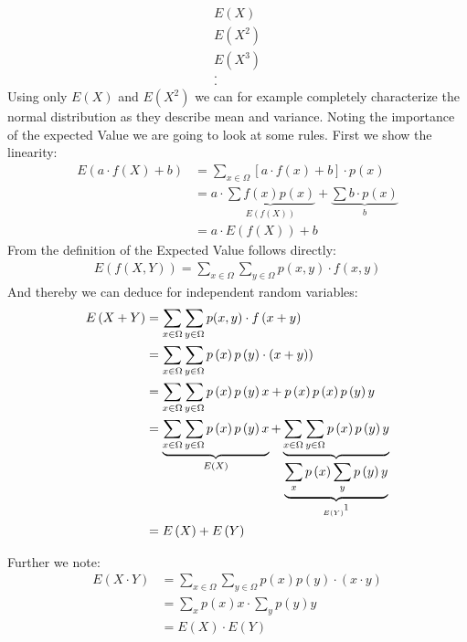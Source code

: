 \documentclass[../main/Notes.tex]{subfiles}
\begin{document}
\begin{align*}
  E\left(X\right)\\
  E\left(X^2\right)\\
  E\left(X^3\right)\\
  .\\.
\end{align*} 
Using only $E\left(X\right)$ and $E\left(X^2\right)$ we can for example completely characterize the normal distribution as they describe mean and variance. 
Noting the importance of the expected Value we are going to look at some rules.
First we show the linearity:
\begin{align*}
  E\left(a\cdot f\left(X\right)+b\right) &= \sum_{x\in\Omega} \left[a\cdot f\left(x\right)+b\right]\cdot p\left(x\right)\\
  &= a \cdot\underbrace{\sum f\left(x\right)p\left(x\right)}_{E\left(f\left(X\right)\right)} + \underbrace{\sum b\cdot p\left(x\right)}_{b}\\
  &= a \cdot E\left(f\left(X\right)\right) + b
\end{align*} 
From the definition of the Expected Value follows directly:
\begin{align*}
  E\left(f\left(X,Y\right)\right) = \sum_{x\in\Omega}\sum_{y\in\Omega}p(x,y)\cdot f\left(x,y\right)
\end{align*}
And thereby we can deduce for independent random variables: 
\begin{align*}
  E\left(X+Y\right) &= \sum_{x\in\Omega}\sum_{y\in\Omega}p(x,y)\cdot f\left(x+y\right)\\
  &=  \sum_{x\in\Omega}\sum_{y\in\Omega} p\left(x\right)p\left(y\right) \cdot \left(x+y)\right)\\
  &= \sum_{x\in\Omega}\sum_{y\in\Omega} p\left(x\right)p\left(y\right) x + p\left(x\right)p\left(x\right)p\left(y\right) y\\
  &= \underbrace{\sum_{x\in\Omega}\sum_{y\in\Omega}p\left(x\right)p\left(y\right)x}_{E\left(X\right)} + \underbrace{\sum_{x\in\Omega}\sum_{y\in\Omega}p\left(x\right)p\left(y\right)y}_{\underbrace{\sum_x p\left(x\right)\sum_y p\left(y\right)y}_{E\left(Y\right)\footnotemark}}\\
  &= E\left(X\right) + E\left(Y\right) 
\end{align*}
\newpage

Further we note:
\begin{align*}
  E\left(X\cdot Y\right) &= \sum_{x\in\Omega}\sum_{y\in\Omega} p\left(x\right)p\left(y\right)\cdot \left(x\cdot y\right)\\
  &= \sum_x p\left(x\right) x \cdot \sum_y p\left(y\right)y\\
  &= E\left(X\right) \cdot E\left(Y\right)
\end{align*}
\end{document}
